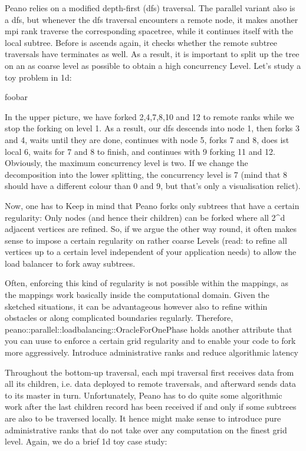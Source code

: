 Peano relies on a modified depth-first (dfs) traversal. The parallel variant also is a dfs, but whenever the dfs traversal encounters a remote node, it makes another mpi rank traverse the corresponding spacetree, while it continues itself with the local subtree. Before is ascends again, it checks whether the remote subtree traversals have terminates as well. As a result, it is important to split up the tree on an as coarse level as possible to obtain a high concurrency Level. Let's study a toy problem in 1d:

foobar

In the upper picture, we have forked 2,4,7,8,10 and 12 to remote ranks while we stop the forking on level 1. As a result, our dfs descends into node 1, then forks 3 and 4, waits until they are done, continues with node 5, forks 7 and 8, does ist local 6, waits for 7 and 8 to finish, and continues with 9 forking 11 and 12. Obviously, the maximum concurrency level is two. If we change the decomposition into the lower splitting, the concurrency level is 7 (mind that 8 should have a different colour than 0 and 9, but that's only a visualisation relict).

Now, one has to Keep in mind that Peano forks only subtrees that have a certain regularity: Only nodes (and hence their children) can be forked where all 2^d adjacent vertices are refined. So, if we argue the other way round, it often makes sense to impose a certain regularity on rather coarse Levels (read: to refine all vertices up to a certain level independent of your application needs) to allow the load balancer to fork away subtrees.

Often, enforcing this kind of regularity is not possible within the mappings, as the mappings work basically inside the computational domain. Given the sketched situations, it can be advantageous however also to refine within obstacles or along complicated boundaries regularly. Therefore, peano::parallel::loadbalancing::OracleForOnePhase holds another attribute that you can uuse to enforce a certain grid regularity and to enable your code to fork more aggressively.
Introduce administrative ranks and reduce algorithmic latency

Throughout the bottom-up traversal, each mpi traversal first receives data from all its children, i.e. data deployed to remote traversals, and afterward sends data to its master in turn. Unfortunately, Peano has to do quite some algorithmic work after the last children record has been received if and only if some subtrees are also to be traversed locally. It hence might make sense to introduce pure administrative ranks that do not take over any computation on the finest grid level. Again, we do a brief 1d toy case study:

